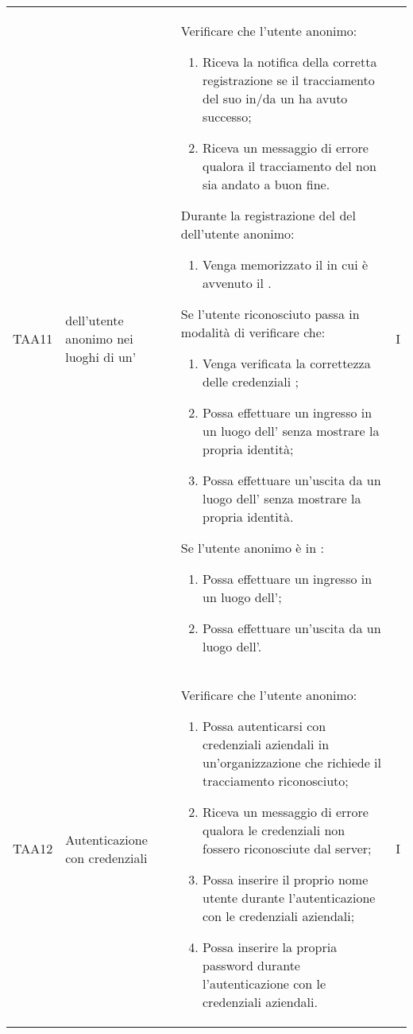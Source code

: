 {\begin{longtable}{ c  C{2.5cm}  C{10cm} C{1cm}}
TAA11 &  dell'utente anonimo nei luoghi di un' &
Verificare che l'utente anonimo:
\begin{enumerate}
    \item Riceva la notifica della corretta registrazione se il tracciamento del suo  in/da un  ha avuto successo;
    \item Riceva un messaggio di errore qualora il tracciamento del  non sia andato a buon fine.
\end{enumerate}
Durante la registrazione del  del  dell'utente anonimo:
\begin{enumerate}[resume]
    \item Venga memorizzato il  in cui è avvenuto il .
\end{enumerate}
Se l'utente riconosciuto passa in modalità di  verificare che:
\begin{enumerate}[resume]
    \item Venga verificata la correttezza delle credenziali ;
    \item Possa effettuare un ingresso in un luogo dell' senza mostrare la propria identità;
    \item Possa effettuare un'uscita da un luogo dell' senza mostrare la propria identità.
\end{enumerate}
Se l'utente anonimo è in :
\begin{enumerate}[resume]
    \item Possa effettuare un ingresso in un luogo dell';
    \item Possa effettuare un'uscita da un luogo dell'.
\end{enumerate} & I \\


TAA12 & Autenticazione con credenziali  &
Verificare che l'utente anonimo:
\begin{enumerate}
    \item Possa autenticarsi con credenziali aziendali in un'organizzazione che richiede il tracciamento riconosciuto;
    \item Riceva un messaggio di errore qualora le credenziali  non fossero riconosciute dal server;
    \item Possa inserire il proprio nome utente durante l'autenticazione con le credenziali  aziendali;
    \item Possa inserire la propria password durante l'autenticazione con le credenziali  aziendali.
\end{enumerate} & I \\


\end{longtable}}
